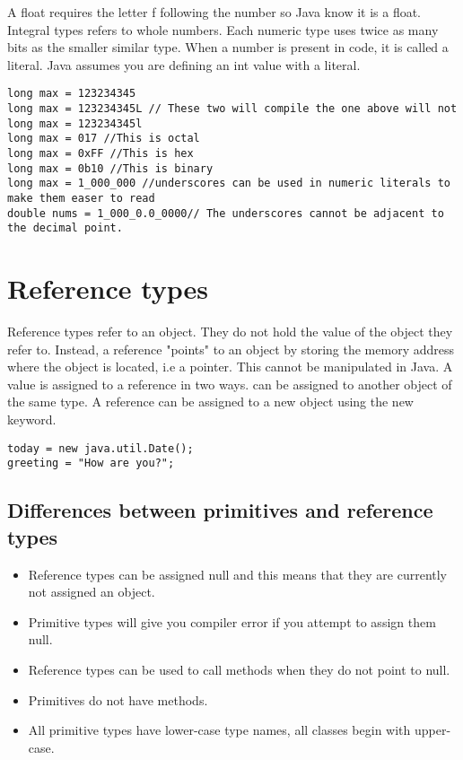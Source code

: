 \documentclass[a4paper]{report}   %
\begin{document}
A float requires the letter f following the number so Java know it is a float. Integral types refers to whole numbers. Each numeric type uses twice as many bits as the smaller similar type. When a number is present in code, it is called a literal. Java assumes you are defining an int value with a literal. 

\begin{lstlisting}
long max = 123234345
long max = 123234345L // These two will compile the one above will not
long max = 123234345l	
long max = 017 //This is octal
long max = 0xFF //This is hex
long max = 0b10 //This is binary	
long max = 1_000_000 //underscores can be used in numeric literals to make them easer to read
double nums = 1_000_0.0_0000// The underscores cannot be adjacent to the decimal point.
\end{lstlisting}

\section{Reference types}

Reference types refer to an object. They do not hold the value of the object they refer to. Instead, a reference "points" to an object by storing the memory address where the object is located, i.e a pointer. This cannot be manipulated in Java. A value is assigned to a reference in two ways. can be assigned to another object of the same type. A reference can be assigned to a new object using the new keyword.

\begin{lstlisting}
today = new java.util.Date();
greeting = "How are you?";
\end{lstlisting}

\subsection{Differences between primitives and reference types}

\begin{itemize}
   \item Reference types can be assigned null and this means that they are currently not assigned an object.
   \item Primitive types will give you compiler error if you attempt to assign them null.
   \item Reference types can be used to call methods when they do not point to null.
   \item Primitives do not have methods.
   \item All primitive types have lower-case type names, all classes begin with upper-case.
\end{itemize}
\end{document}

